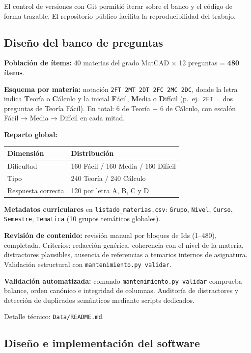 \documentclass[11pt,a4paper]{article}
\newcommand{\bloquetfg}[1]{\par\smallskip\noindent #1\par}
\newcommand{\iniciotabla}{\par\medskip\renewcommand{\arraystretch}{1.12}}
\newcommand{\fintabla}{\par\medskip}
\begin{document}
El control de versiones con Git permitió iterar sobre el banco y el código de forma trazable. El repositorio público facilita la reproducibilidad del trabajo.

\subsection{Diseño del banco de preguntas}

\bloquetfg{\textbf{Población de ítems:} 40 materias del grado MatCAD × 12 preguntas = \textbf{480 ítems}.}

\bloquetfg{\textbf{Esquema por materia:} notación \texttt{2FT 2MT 2DT 2FC 2MC 2DC}, donde la letra indica \textbf{T}eoría o \textbf{C}álculo y la inicial \textbf{F}ácil, \textbf{M}edia o \textbf{D}ifícil (p.\ ej.\ \texttt{2FT} = dos preguntas de Teoría Fácil). En total: 6 de Teoría + 6 de Cálculo, con escalón Fácil → Media → Difícil en cada mitad.}

\bloquetfg{\textbf{Reparto global:}}
\iniciotabla
\begin{tabular}{@{}ll@{}}
\toprule
\textbf{Dimensión} & \textbf{Distribución} \\
\midrule
Dificultad & 160 Fácil / 160 Media / 160 Difícil \\
Tipo & 240 Teoría / 240 Cálculo \\
Respuesta correcta & 120 por letra A, B, C y D \\
\bottomrule
\end{tabular}
\fintabla

\bloquetfg{\textbf{Metadatos curriculares} en \texttt{listado\_materias.csv}: \texttt{Grupo}, \texttt{Nivel}, \texttt{Curso}, \texttt{Semestre}, \texttt{Tematica} (10 grupos temáticos globales).}

\bloquetfg{\textbf{Revisión de contenido:} revisión manual por bloques de Ids (1--480), completada. Criterios: redacción genérica, coherencia con el nivel de la materia, distractores plausibles, ausencia de referencias a temarios internos de asignatura. Validación estructural con \texttt{mantenimiento.py validar}.}

\bloquetfg{\textbf{Validación automatizada:} comando \texttt{mantenimiento.py validar} comprueba balance, orden canónico e integridad de columnas. Auditoría de distractores y detección de duplicados semánticos mediante scripts dedicados.}

\bloquetfg{Detalle técnico: \texttt{Data/README.md}.}

\subsection{Diseño e implementación del software}
\end{document}
